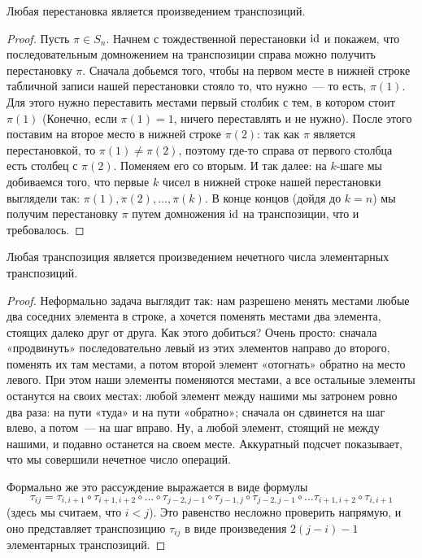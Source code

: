 \begin{proposition}\label{prop:product_of_transpositions}
Любая перестановка является произведением транспозиций.
\end{proposition}
\begin{proof}
Пусть $\pi\in S_n$.
Начнем с тождественной перестановки $\operatorname{id}$ и покажем, что
последовательным домножением на транспозиции справа можно получить
перестановку $\pi$. Сначала добьемся того, чтобы на первом месте в
нижней строке табличной записи нашей перестановки стояло то, что
нужно~--- то есть, $\pi(1)$. Для этого нужно переставить местами
первый столбик с тем, в котором стоит $\pi(1)$ (Конечно, если
$\pi(1)=1$, ничего переставлять и не нужно). После этого поставим
на второе место в нижней строке $\pi(2)$: так как $\pi$ является
перестановкой, то $\pi(1)\neq\pi(2)$, поэтому где-то справа от первого
столбца есть столбец с $\pi(2)$. Поменяем его со вторым. И так далее:
на $k$-шаге мы добиваемся того, что первые $k$ чисел в нижней строке
нашей перестановки выглядели так: $\pi(1),\pi(2),\dots,\pi(k)$. В
конце концов (дойдя до $k=n$) мы получим перестановку $\pi$ путем
домножения $\operatorname{id}$ на транспозиции, что и требовалось.
\end{proof}
\begin{proposition}\label{prop_odd_number_of_elementary_transpositions}
Любая транспозиция является произведением нечетного числа элементарных
транспозиций.
\end{proposition}
\begin{proof}
Неформально задача выглядит так: нам разрешено менять местами любые
два соседних элемента в строке, а хочется поменять местами два
элемента, стоящих далеко друг от друга. Как этого добиться? Очень
просто: сначала «продвинуть» последовательно левый из этих элементов
направо до второго, поменять их там местами, а потом второй элемент
«отогнать» обратно на место левого. При этом наши элементы поменяются
местами, а все остальные элементы останутся на своих местах: любой
элемент между нашими мы затронем ровно два раза: на пути «туда» и на
пути «обратно»; сначала он сдвинется на шаг влево, а потом~--- на шаг
вправо. Ну, а любой элемент, стоящий не между нашими, и подавно
останется на своем месте. Аккуратный подсчет показывает, что мы
совершили нечетное число операций.

Формально же это рассуждение выражается в виде формулы
$$
\tau_{ij}=\tau_{i,i+1}\circ\tau_{i+1,i+2}\circ\dots
\circ\tau_{j-2,j-1}\circ\tau_{j-1,j}\circ\tau_{j-2,j-1}\circ\dots
\tau_{i+1,i+2}\circ\tau_{i,i+1}
$$
(здесь мы считаем, что $i<j$).
Это равенство несложно проверить напрямую, и оно представляет
транспозицию $\tau_{ij}$ в виде произведения $2(j-i)-1$ элементарных
транспозиций.
\end{proof}

